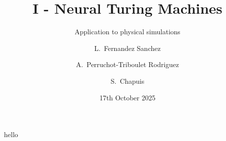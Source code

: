 \documentclass{beamer}
\title{I - Neural Turing Machines}
\subtitle{Application to physical simulations}
\author[Lucia Fernandez Sanchez, Alexandra Perruchot-Triboulet Rodriguez, Samuel Chapuis]{L.~Fernandez Sanchez \and A.~Perruchot-Triboulet Rodriguez \and S.~Chapuis}
\date{17th October 2025}
\begin{document}
\frame{\titlepage}
\begin{frame}
  hello
\end{frame}

    
\end{document}
